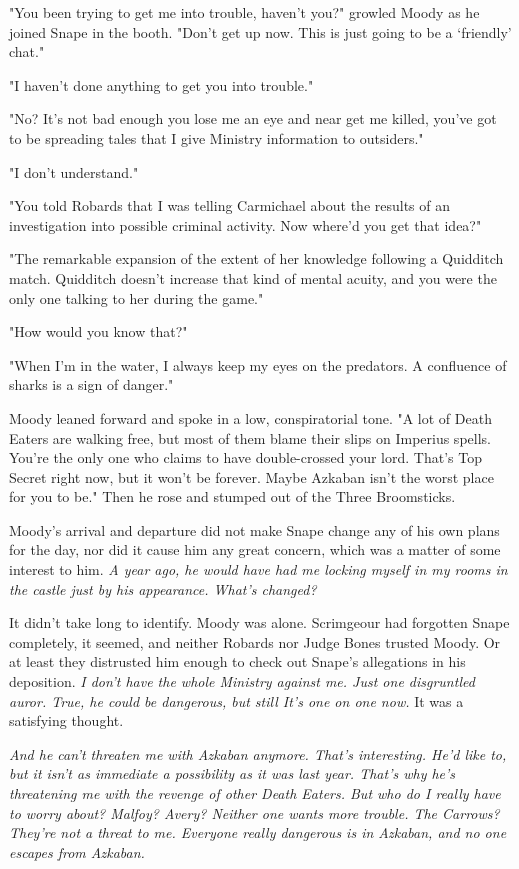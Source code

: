 "You been trying to get me into trouble, haven't you?" growled Moody as he joined Snape in the booth. "Don't get up now. This is just going to be a `friendly' chat."

"I haven't done anything to get you into trouble."

"No? It's not bad enough you lose me an eye and near get me killed, you've got to be spreading tales that I give Ministry information to outsiders."

"I don't understand."

"You told Robards that I was telling Carmichael about the results of an investigation into possible criminal activity. Now where'd you get that idea?"

"The remarkable expansion of the extent of her knowledge following a Quidditch match. Quidditch doesn't increase that kind of mental acuity, and you were the only one talking to her during the game."

"How would you know that?"

"When I'm in the water, I always keep my eyes on the predators. A confluence of sharks is a sign of danger."

Moody leaned forward and spoke in a low, conspiratorial tone. "A lot of Death Eaters are walking free, but most of them blame their slips on Imperius spells. You're the only one who claims to have double-crossed your lord. That's Top Secret right now, but it won't be forever. Maybe Azkaban isn't the worst place for you to be." Then he rose and stumped out of the Three Broomsticks.

Moody's arrival and departure did not make Snape change any of his own plans for the day, nor did it cause him any great concern, which was a matter of some interest to him. \emph{A year ago, he would have had me locking myself in my rooms in the castle just by his appearance. What's changed?}

It didn't take long to identify. Moody was alone. Scrimgeour had forgotten Snape completely, it seemed, and neither Robards nor Judge Bones trusted Moody. Or at least they distrusted him enough to check out Snape's allegations in his deposition. \emph{I don't have the whole Ministry against me. Just one disgruntled auror. True, he could be dangerous, but still{\el} It's one on one now.} It was a satisfying thought.

\emph{And he can't threaten me with Azkaban anymore. That's interesting. He'd like to, but it isn't as immediate a possibility as it was last year. That's why he's threatening me with the revenge of other Death Eaters. But who do I really have to worry about? Malfoy? Avery? Neither one wants more trouble. The Carrows? They're not a threat to me. Everyone really dangerous is in Azkaban, and no one escapes from Azkaban.}


